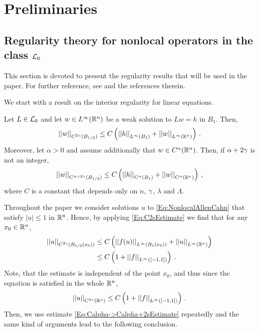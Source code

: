 \section{Preliminaries}
\label{Sec:Preliminaries}


\subsection{Regularity theory for nonlocal operators in the class $\mathcal{L}_0$}
\label{Subsec:Regularity}


This section is devoted to present the regularity results that will be used in the paper. For
further reference, see \cite{RosOton-Survey,SerraC2s+alphaRegularity} and the references therein.

We start with a result on the interior regularity for linear equations.

\begin{proposition}
\label{Prop:InteriorRegularity}
Let $L\in\mathcal{L}_0$ and let $w\in L^\infty (\mathbb{R}^n)$ be a weak solution to $Lw = h$ in $B_1$. Then,
\begin{equation}
\label{Eq:C2sEstimate}
\left | \left |{w} \right | \right |_{C^{2\gamma} (B_{1/2})} \leq C\left ( {\left | \left |{h} \right | \right |_{L^\infty (B_1)} + \left | \left |{w} \right | \right |_{L^\infty  (\mathbb{R}^n)} }\right )\,.
\end{equation}
Moreover, let $\alpha > 0$ and assume additionally that $w \in C^\alpha (\mathbb{R}^n)$. Then, if $\alpha +
2\gamma$ is not an integer,
\begin{equation}
\label{Eq:Calpha->Calpha+2sEstimate}
\left | \left |{w} \right | \right |_{C^{\alpha + 2\gamma} (B_{1/2})} \leq C\left ( {\left | \left |{h} \right | \right |_{C^{\alpha} (B_1)} + \left | \left |{w} \right | \right |_{C^\alpha (\mathbb{R}^n)} }\right )\,,
\end{equation}
where $C$ is a constant that depends only on $n$, $\gamma$, $\lambda$ and $\Lambda$.
\end{proposition}

Throughout the paper we consider solutions $u$ to \eqref{Eq:NonlocalAllenCahn} that satisfy
$|u|\leq 1$ in $\mathbb{R}^n$. Hence, by applying \eqref{Eq:C2sEstimate} we find that for any $x_0\in
\mathbb{R}^n$,
\begin{align*}
\left | \left |{u} \right | \right |_{C^{2\gamma} (B_{1/2} (x_0))} &\leq C\left ( {\left | \left |{f(u)} \right | \right |_{L^\infty (B_1(x_0))} + \left | \left |{u} \right | \right |_{L^\infty  (\mathbb{R}^n)} }\right ) \\
&\leq C\left ( {1 + \left | \left |{f} \right | \right |_{L^\infty ([-1,1])} }\right )\,.
\end{align*}
Note, that the estimate is independent of the point $x_0$, and thus since the equation is satisfied
in the whole $\mathbb{R}^n$,
$$
\left | \left |{u} \right | \right |_{C^{2\gamma}(\mathbb{R}^n)} \leq C\left ( {1 + \left | \left |{f} \right | \right |_{L^\infty ([-1,1])} }\right )\,.
$$
Then, we use estimate \eqref{Eq:Calpha->Calpha+2sEstimate} repeatedly and  the same kind of
arguments lead to the following conclusion.

